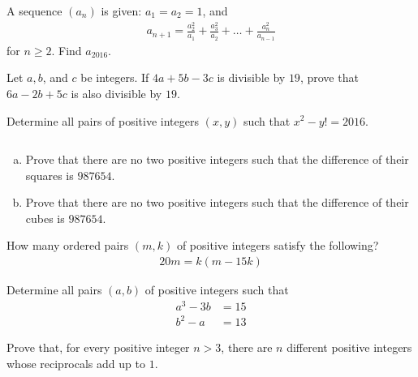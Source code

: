 \documentclass[problems.tex]{subfile}
\begin{document}
	\begin{problem}
		A sequence $(a_n)$ is given: $a_1=a_2=1$, and
		\begin{align*}
			a_{n+1} = \frac{a_2^2}{a_1} + \frac{a_3^2}{a_2} + \dots + \frac{a_n^2}{a_{n-1}}
		\end{align*}
		for $n\geq 2$. Find $a_{2016}$.
	\end{problem}

	\begin{problem}
		Let $a, b$, and $c$ be integers. If $4a+5b-3c$ is divisible by $19$, prove that $6a-2b+5c$ is also divisible by $19$.
	\end{problem}

	\begin{problem}
		Determine all pairs of positive integers $(x, y)$ such that $x^2 - y! = 2016$.
	\end{problem}

	\begin{problem}
		$ $
		\begin{enumerate}[(a)]
			\item Prove that there are no two positive integers such that the difference of their squares is $987654$.
			\item Prove that there are no two positive integers such that the difference of their cubes is $987654$.
		\end{enumerate}
	\end{problem}

	\begin{problem}
		How many ordered pairs $(m, k)$ of positive integers satisfy the following?
		\begin{align*}
			20m = k(m - 15k)
		\end{align*}
	\end{problem}

	\begin{problem}
		Determine all pairs $(a, b)$ of positive integers such that
		\begin{align*}
			a^3 - 3b &= 15\\
			b^2 - a  &= 13
		\end{align*}
	\end{problem}

	\begin{problem}
		Prove that, for every positive integer $n > 3$, there are $n$ different positive integers whose reciprocals add up to $1$.
	\end{problem}
\end{document}
